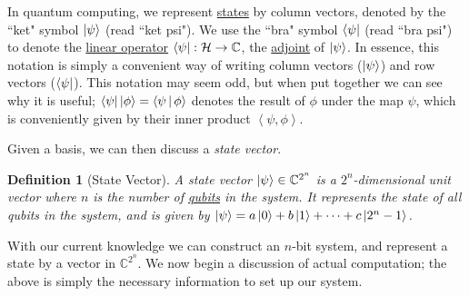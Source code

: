 \documentclass{article}
\renewcommand{\bra}{\Bra}
\renewcommand{\ket}{\Ket}
\renewcommand{\braket}{\Braket}
\theoremstyle{plain}
\theoremstyle{centered}
\newtheorem{definition}{Definition}
\renewcommand{\bra}{\Bra}
\renewcommand{\ket}{\Ket}
\renewcommand{\braket}{\Braket}
\newcommand{\inner}[2]{\left\langle #1, #2 \right\rangle}
\newcommand{\bb}[1]{\mathbb{#1}}
\renewcommand{\cal}[1]{\mathcal{#1}}
\begin{document}
        In quantum computing, we represent \hyperref[def:state_vector]{states} by column vectors, denoted by the ``ket" symbol $\ket{\psi}$ (read ``ket psi").
        We use the ``bra" symbol $\bra{\psi}$ (read ``bra psi") to denote the \hyperref[def:linear_operator]{linear operator} $\bra{\psi} : \cal{H} \to \bb{C}$, the \hyperref[def:adjoint_operator]{adjoint} of $\ket{\psi}$.
        In essence, this notation is simply a convenient way of writing column vectors ($\ket{\psi}$) and row vectors ($\bra{\psi}$). This notation may seem odd, but when put together we can see why it is useful; $\bra{\psi} \ket{\phi} = \braket{\psi | \phi}$ denotes the result of $\phi$ under the map $\psi$, which is conveniently given by their inner product $\inner{\psi}{\phi}$.

        
        Given a basis, we can then discuss a \textit{state vector}.
        \begin{definition}[State Vector]\label{def:state_vector}
            A \textit{state vector} $\ket{\psi} \in \bb{C}^{2^n}$ is a $2^n$-dimensional unit vector where $n$ is the number of \hyperref[def:qubit]{qubits} in the system.
            It represents the state of all qubits in the system, and is given by $\ket{\psi} = a \ket{0} + b \ket{1} + \dots + c \ket{2^n - 1}$.
        \end{definition}

        With our current knowledge we can construct an $n$-bit system, and represent a state by a vector in $\bb{C}^{2^n}$. We now begin a discussion of actual computation; the above is simply the necessary information to set up our system.
\end{document}
